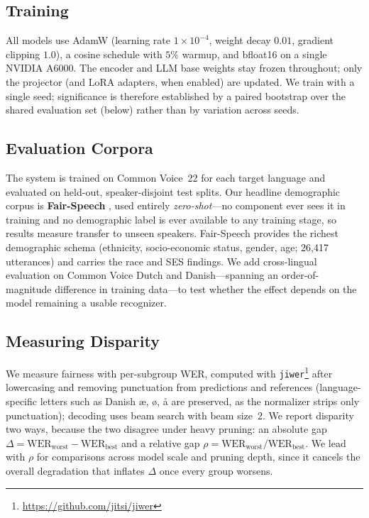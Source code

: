 \subsection{Training}
All models use AdamW \citep{loshchilov2017decoupled} (learning rate
$1{\times}10^{-4}$, weight decay $0.01$, gradient clipping $1.0$), a cosine
schedule with $5\%$ warmup, and bfloat16 on a single NVIDIA A6000. The encoder
and LLM base weights stay frozen throughout; only the projector (and LoRA
adapters, when enabled) are updated. We train with a single seed; significance
is therefore established by a paired bootstrap over the shared evaluation set
(below) rather than by variation across seeds.

\subsection{Evaluation Corpora}
The system is trained on Common Voice~22 \citep{ardila2020common} for each
target language and evaluated on held-out, speaker-disjoint test splits. Our
headline demographic corpus is \textbf{Fair-Speech} \citep{[FAIRSPEECH_CITE]},
used entirely \emph{zero-shot}---no component ever sees it in training and no
demographic label is ever available to any training stage, so results measure
transfer to unseen speakers. Fair-Speech provides the richest demographic
schema (ethnicity, socio-economic status, gender, age; 26{,}417 utterances) and
carries the race and SES findings. We add cross-lingual evaluation on Common
Voice Dutch and Danish---spanning an order-of-magnitude difference in training
data---to test whether the effect depends on the model remaining a usable
recognizer.

\subsection{Measuring Disparity}
We measure fairness with per-subgroup WER, computed with
\texttt{jiwer}\footnote{\url{https://github.com/jitsi/jiwer}} after lowercasing
and removing punctuation from predictions and references (language-specific
letters such as Danish \ae, \o, \aa{} are preserved, as the normalizer strips
only punctuation); decoding uses beam search with beam size~2. We report
disparity two ways, because the two disagree under heavy pruning: an absolute
gap $\Delta = \text{WER}_{\text{worst}} - \text{WER}_{\text{best}}$ and a
relative gap $\rho = \text{WER}_{\text{worst}} / \text{WER}_{\text{best}}$. We
lead with $\rho$ for comparisons across model scale and pruning depth, since it
cancels the overall degradation that inflates $\Delta$ once every group worsens.


